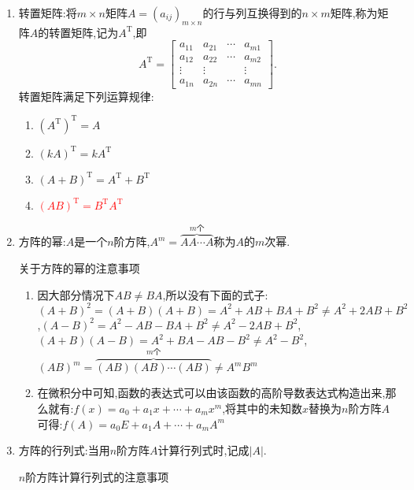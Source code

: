 \documentclass[8pt a4paper,oneside,UTF8]{ctexbook}
\begin{document}
\begin{sloppypar}
\begin{enumerate}
\begin{criterion}{关于矩阵乘法下$AB\neq BA$}{}
              \end{criterion}
        \item 转置矩阵:将$m \times n$矩阵$A=(a_{ij})_{m\times n}$的行与列互换得到的$n\times m$矩阵,称为矩阵$A$的转置矩阵,记为$A^\mathrm{T}$,即$$A^\mathrm{T}=\begin{bmatrix}a_{11}&a_{21}&\cdots&a_{m1}\\a_{12}&a_{22}&\cdots&a_{m2}\\\vdots&\vdots&&\vdots\\a_{1n}&a_{2n}&\cdots&a_{mn}\end{bmatrix}.$$转置矩阵满足下列运算规律:
              \begin{enumerate}
                  \item $(A^{\mathrm{T}})^{\mathrm{T}}=A$
                  \item $(kA)^{\mathrm{T}}=kA^{\mathrm{T}}$
                  \item $(A+B)^{\mathrm{T}}=A^{\mathrm{T}}+B^{\mathrm{T}}$
                  \item \textcolor{red}{$(AB)^{\mathrm{T}}=B^{\mathrm{T}}A^{\mathrm{T}}$}
              \end{enumerate}
        \item 方阵的幂:$A$是一个$n$阶方阵,$A^m=\overbrace{AA\cdots A}^{m\text{个}}$称为$A$的$m$次幂.
              \begin{criterion}{关于方阵的幂的注意事项}{}
                  \begin{enumerate}
                      \item 因大部分情况下$AB \neq BA$,所以没有下面的式子:\newline$(A+B)^{2}=(A+B)(A+B)=A^{2}+AB+BA+B^{2}\neq A^{2}+2AB+B^2$ ,\newline$(A-B)^{2}=A^{2}-AB-BA+B^{2} \neq A^{2}-2AB+B^{2}$,\newline$(A+B)(A-B)=A^{2}+BA-AB-B^{2}\neq A^{2}-B^{2}$,\newline$(AB)^m=\overbrace{(AB)(AB)\cdots (AB)}^{m\text{个}}\neq A^m B^m$
                      \item 在微积分中可知,函数的表达式可以由该函数的高阶导数表达式构造出来,那么就有:$f(x)=a_0+a_1x+\cdots+a_mx^m$,将其中的未知数$x$替换为$n$阶方阵$A$可得:\textbf{$f(A)=a_0E+a_1A+\cdots+a_mA^m$}
                  \end{enumerate}
              \end{criterion}
        \item 方阵的行列式:当用$n$阶方阵$A$计算行列式时,记成$|A|$.
              \begin{criterion}{$n$阶方阵计算行列式的注意事项}{}

\end{criterion}
\end{enumerate}
\end{sloppypar}
\end{document}

